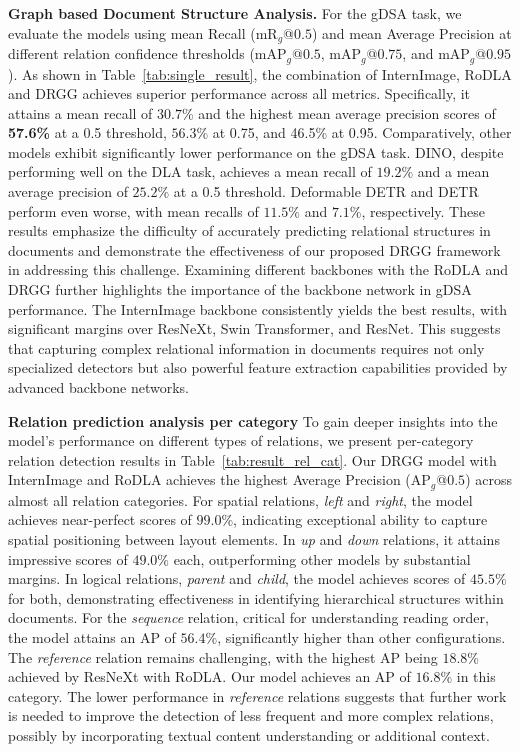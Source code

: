 \noindent\textbf{Graph based Document Structure Analysis.} For the gDSA task, we evaluate the models using mean Recall (mR$_g$@$0.5$) and mean Average Precision at different relation confidence thresholds (mAP$_g$@$0.5$, mAP$_g$@$0.75$, and mAP$_g$@$0.95$). As shown in Table~\ref{tab:single_result}, the combination of InternImage, RoDLA and DRGG achieves superior performance across all metrics. Specifically, it attains a mean recall of $30.7\%$ and the highest mean average precision scores of \textbf{57.6\%} at a 0.5 threshold, $56.3\%$ at 0.75, and 46.5\% at 0.95. Comparatively, other models exhibit significantly lower performance on the gDSA task. DINO, despite performing well on the DLA task, achieves a mean recall of $19.2\%$ and a mean average precision of $25.2\%$ at a 0.5 threshold. Deformable DETR and DETR perform even worse, with mean recalls of $11.5\%$ and $7.1\%$, respectively. These results emphasize the difficulty of accurately predicting relational structures in documents and demonstrate the effectiveness of our proposed DRGG framework in addressing this challenge. Examining different backbones with the RoDLA and DRGG further highlights the importance of the backbone network in gDSA performance. The InternImage backbone consistently yields the best results, with significant margins over ResNeXt, Swin Transformer, and ResNet. This suggests that capturing complex relational information in documents requires not only specialized detectors but also powerful feature extraction capabilities provided by advanced backbone networks.

\noindent \textbf{Relation prediction analysis per category} To gain deeper insights into the model's performance on different types of relations, we present per-category relation detection results in Table~\ref{tab:result_rel_cat}. Our DRGG model with InternImage and RoDLA achieves the highest Average Precision (AP$_g$@$0.5$) across almost all relation categories. For spatial relations, \textit{left} and \textit{right}, the model achieves near-perfect scores of $99.0\%$, indicating exceptional ability to capture spatial positioning between layout elements. In \textit{up} and \textit{down} relations, it attains impressive scores of $49.0\%$ each, outperforming other models by substantial margins. In logical relations, \textit{parent} and \textit{child}, the model achieves scores of $45.5\%$ for both, demonstrating effectiveness in identifying hierarchical structures within documents. For the \textit{sequence} relation, critical for understanding reading order, the model attains an AP of $56.4\%$, significantly higher than other configurations. The \textit{reference} relation remains challenging, with the highest AP being $18.8\%$ achieved by ResNeXt with RoDLA. Our model achieves an AP of $16.8\%$ in this category. The lower performance in \textit{reference} relations suggests that further work is needed to improve the detection of less frequent and more complex relations, possibly by incorporating textual content understanding or additional context. 

